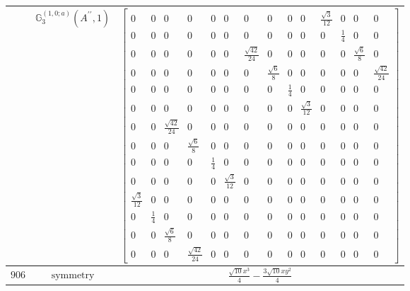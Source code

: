 \documentclass[fleqn,8pt,landscape]{jsarticle}
\begin{document}
\begin{longtable}{ccc}
$  $ & $ \mathbb{G}_{3}^{(1,0;a)}(A^{\prime\prime},1) $ & $ \begin{bmatrix} 0 & 0 & 0 & 0 & 0 & 0 & 0 & 0 & 0 & 0 & \frac{\sqrt{3}}{12} & 0 & 0 & 0 \\ 0 & 0 & 0 & 0 & 0 & 0 & 0 & 0 & 0 & 0 & 0 & \frac{1}{4} & 0 & 0 \\ 0 & 0 & 0 & 0 & 0 & 0 & \frac{\sqrt{42}}{24} & 0 & 0 & 0 & 0 & 0 & \frac{\sqrt{6}}{8} & 0 \\ 0 & 0 & 0 & 0 & 0 & 0 & 0 & \frac{\sqrt{6}}{8} & 0 & 0 & 0 & 0 & 0 & \frac{\sqrt{42}}{24} \\ 0 & 0 & 0 & 0 & 0 & 0 & 0 & 0 & \frac{1}{4} & 0 & 0 & 0 & 0 & 0 \\ 0 & 0 & 0 & 0 & 0 & 0 & 0 & 0 & 0 & \frac{\sqrt{3}}{12} & 0 & 0 & 0 & 0 \\ 0 & 0 & \frac{\sqrt{42}}{24} & 0 & 0 & 0 & 0 & 0 & 0 & 0 & 0 & 0 & 0 & 0 \\ 0 & 0 & 0 & \frac{\sqrt{6}}{8} & 0 & 0 & 0 & 0 & 0 & 0 & 0 & 0 & 0 & 0 \\ 0 & 0 & 0 & 0 & \frac{1}{4} & 0 & 0 & 0 & 0 & 0 & 0 & 0 & 0 & 0 \\ 0 & 0 & 0 & 0 & 0 & \frac{\sqrt{3}}{12} & 0 & 0 & 0 & 0 & 0 & 0 & 0 & 0 \\ \frac{\sqrt{3}}{12} & 0 & 0 & 0 & 0 & 0 & 0 & 0 & 0 & 0 & 0 & 0 & 0 & 0 \\ 0 & \frac{1}{4} & 0 & 0 & 0 & 0 & 0 & 0 & 0 & 0 & 0 & 0 & 0 & 0 \\ 0 & 0 & \frac{\sqrt{6}}{8} & 0 & 0 & 0 & 0 & 0 & 0 & 0 & 0 & 0 & 0 & 0 \\ 0 & 0 & 0 & \frac{\sqrt{42}}{24} & 0 & 0 & 0 & 0 & 0 & 0 & 0 & 0 & 0 & 0 \end{bmatrix} $ \\ \hline
$ 906 $ & $ \text{symmetry} $ & $ \frac{\sqrt{10} x^{3}}{4} - \frac{3 \sqrt{10} x y^{2}}{4} $ \\

\end{longtable}
\end{document}
